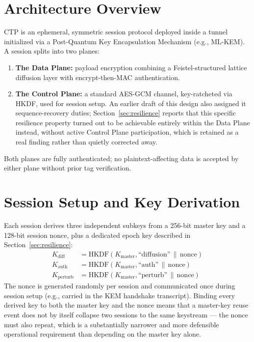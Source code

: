 \documentclass[twocolumn,10pt,journal,compsoc]{IEEEtran}
\begin{document}
\section{Architecture Overview}
\label{sec:architecture}
CTP is an ephemeral, symmetric session protocol deployed inside a tunnel initialized via a Post-Quantum Key Encapsulation Mechanism (e.g., ML-KEM). A session splits into two planes:
\begin{enumerate}
    \item \textbf{The Data Plane:} payload encryption combining a Feistel-structured lattice diffusion layer with encrypt-then-MAC authentication.
    \item \textbf{The Control Plane:} a standard AES-GCM channel, key-ratcheted via HKDF, used for session setup. An earlier draft of this design also assigned it sequence-recovery duties; Section~\ref{sec:resilience} reports that this specific resilience property turned out to be achievable entirely within the Data Plane instead, without active Control Plane participation, which is retained as a real finding rather than quietly corrected away.
\end{enumerate}
Both planes are fully authenticated; no plaintext-affecting data is accepted by either plane without prior tag verification.

\section{Session Setup and Key Derivation}
Each session derives three independent subkeys from a 256-bit master key and a 128-bit session nonce, plus a dedicated epoch key described in Section~\ref{sec:resilience}:
\begin{align}
K_{\text{diff}} &= \text{HKDF}(K_{\text{master}}, \text{``diffusion''} \,\|\, \text{nonce}) \\
K_{\text{auth}} &= \text{HKDF}(K_{\text{master}}, \text{``auth''} \,\|\, \text{nonce}) \\
K_{\text{perturb}} &= \text{HKDF}(K_{\text{master}}, \text{``perturb''} \,\|\, \text{nonce})
\end{align}
The nonce is generated randomly per session and communicated once during session setup (e.g., carried in the KEM handshake transcript). Binding every derived key to both the master key and the nonce means that a master-key reuse event does not by itself collapse two sessions to the same keystream --- the nonce must also repeat, which is a substantially narrower and more defensible operational requirement than depending on the master key alone.
\end{document}
